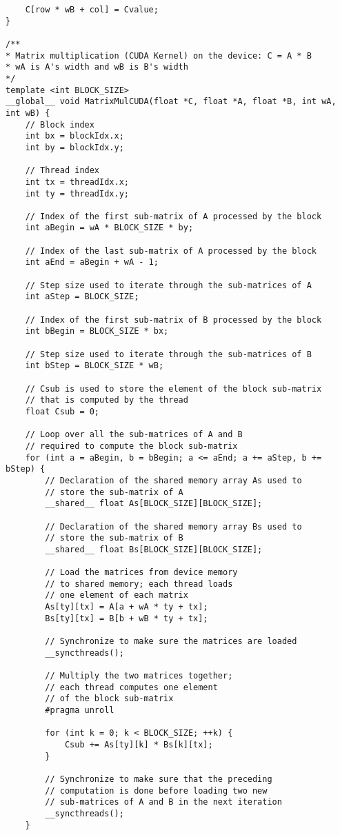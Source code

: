 \begin{lstlisting}
	C[row * wB + col] = Cvalue;
}

/**
* Matrix multiplication (CUDA Kernel) on the device: C = A * B
* wA is A's width and wB is B's width
*/
template <int BLOCK_SIZE>
__global__ void MatrixMulCUDA(float *C, float *A, float *B, int wA, int wB) {
	// Block index
	int bx = blockIdx.x;
	int by = blockIdx.y;
	
	// Thread index
	int tx = threadIdx.x;
	int ty = threadIdx.y;
	
	// Index of the first sub-matrix of A processed by the block
	int aBegin = wA * BLOCK_SIZE * by;
	
	// Index of the last sub-matrix of A processed by the block
	int aEnd = aBegin + wA - 1;
	
	// Step size used to iterate through the sub-matrices of A
	int aStep = BLOCK_SIZE;
	
	// Index of the first sub-matrix of B processed by the block
	int bBegin = BLOCK_SIZE * bx;
	
	// Step size used to iterate through the sub-matrices of B
	int bStep = BLOCK_SIZE * wB;
	
	// Csub is used to store the element of the block sub-matrix
	// that is computed by the thread
	float Csub = 0;
	
	// Loop over all the sub-matrices of A and B
	// required to compute the block sub-matrix
	for (int a = aBegin, b = bBegin; a <= aEnd; a += aStep, b += bStep) {
		// Declaration of the shared memory array As used to
		// store the sub-matrix of A
		__shared__ float As[BLOCK_SIZE][BLOCK_SIZE];
		
		// Declaration of the shared memory array Bs used to
		// store the sub-matrix of B
		__shared__ float Bs[BLOCK_SIZE][BLOCK_SIZE];
		
		// Load the matrices from device memory
		// to shared memory; each thread loads
		// one element of each matrix
		As[ty][tx] = A[a + wA * ty + tx];
		Bs[ty][tx] = B[b + wB * ty + tx];
		
		// Synchronize to make sure the matrices are loaded
		__syncthreads();
		
		// Multiply the two matrices together;
		// each thread computes one element
		// of the block sub-matrix
		#pragma unroll
		
		for (int k = 0; k < BLOCK_SIZE; ++k) {
			Csub += As[ty][k] * Bs[k][tx];
		}
		
		// Synchronize to make sure that the preceding
		// computation is done before loading two new
		// sub-matrices of A and B in the next iteration
		__syncthreads();
	}
	

\end{lstlisting}
